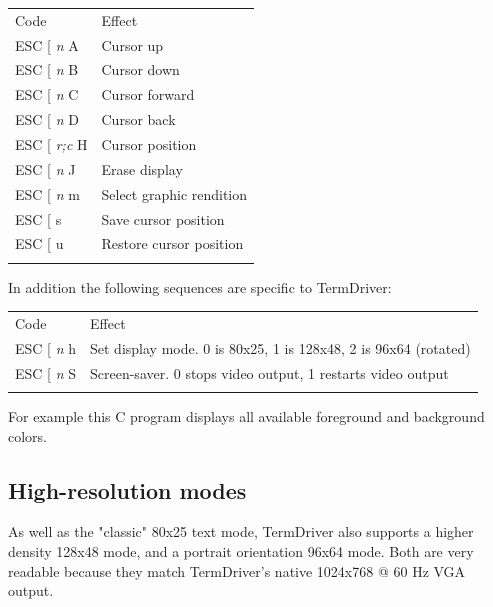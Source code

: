 \documentclass{article}
\newcommand{\heavyline}{\specialrule{1pt}{1pt}{1pt}}
\newcommand{\gap}{\vspace{10pt}}
\begin{document}
\gap\noindent
\begin{tabularx}{\linewidth}{lX}
\heavyline
Code & Effect \\ \heavyline

ESC {[} \emph{n} A & Cursor up \\

ESC {[} \emph{n} B & Cursor down \\

ESC {[} \emph{n} C & Cursor forward \\

ESC {[} \emph{n} D & Cursor back \\

ESC {[} \emph{r;c} H & Cursor position \\

ESC {[} \emph{n} J & Erase display \\

ESC {[} \emph{n} m & Select graphic rendition \\

ESC {[} s & Save cursor position \\

ESC {[} u & Restore cursor position \\ \heavyline
\end{tabularx}
\gap

In addition the following sequences are specific to TermDriver:

\gap
\noindent
\begin{tabularx}{\linewidth}{lX}
\heavyline
Code & Effect \\ \heavyline

ESC {[} \emph{n} h & 
Set display mode.  0 is 80x25, 1 is 128x48, 2 is 96x64 (rotated)
\\

ESC {[} \emph{n} S & Screen-saver.  0 stops video output, 1 restarts video output
\\ \heavyline
\end{tabularx}
\gap

\noindent
For example this C program displays all available foreground and background colors.


\subsection{High-resolution modes}

As well as the "classic" 80x25 text mode,
TermDriver also supports a higher density 128x48 mode,
and a portrait orientation 96x64 mode.
Both are very readable because
they match TermDriver's native 1024x768 @ 60 Hz VGA output.
\end{document}
